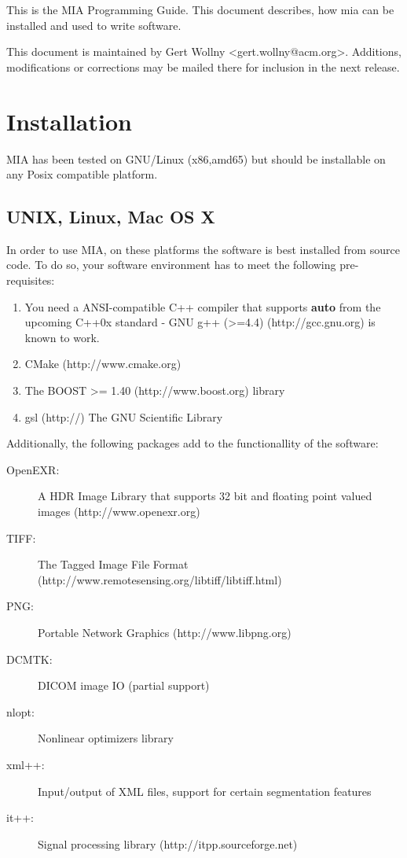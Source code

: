 \documentclass[english, 10pt, a4paper,headsepline,openany]{scrbook}
\begin{document}
This is the MIA Programming Guide. This document describes, how mia can be installed and used to 
  write software. 

This document is maintained by Gert Wollny <gert.wollny@acm.org>. 
Additions, modifications or corrections may be mailed there for inclusion in the next release. 

\section{Installation}

MIA has been tested on GNU/Linux (x86,amd65) but should be installable on any Posix compatible platform. 


\subsection{UNIX, Linux, Mac OS X} 

In order to use MIA, on these platforms the software is best installed from source code. 
To do so, your software environment has to meet the following pre-requisites: 

\begin{enumerate}
\item You need a ANSI-compatible C++ compiler that supports {\bf auto} from the upcoming 
   C++0x standard - GNU g++ (>=4.4) (http://gcc.gnu.org) is known to work. 
\item CMake (http://www.cmake.org) 
\item The BOOST >= 1.40 (http://www.boost.org) library
\item gsl (http://) The GNU Scientific Library 
\end{enumerate}

Additionally, the following packages add to the functionallity of the software: 

\begin{description}
\item [OpenEXR:] A HDR Image Library that supports 32 bit and floating point valued images (http://www.openexr.org)
\item [TIFF:]    The Tagged Image File Format (http://www.remotesensing.org/libtiff/libtiff.html)
\item [PNG:]     Portable Network Graphics (http://www.libpng.org)
\item [DCMTK:]   DICOM image IO (partial support) 
\item [nlopt:]   Nonlinear optimizers library 
\item [xml++:]   Input/output of XML files, support for certain segmentation features
\item [it++:]    Signal processing library (http://itpp.sourceforge.net) 
\end{description}
\end{document}
